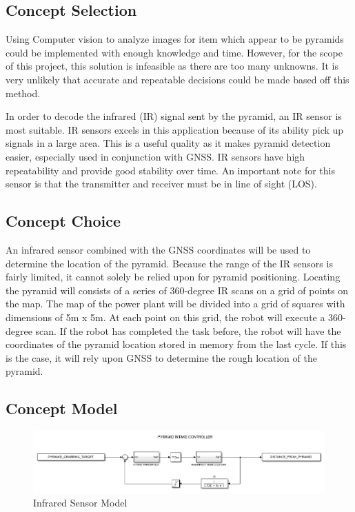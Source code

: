 \documentclass[12pt]{article}
\begin{document}
\subsection{Concept Selection}
Using Computer vision to analyze images for item which appear to be pyramids could be implemented with enough knowledge and time. However, for the scope of this project, this solution is infeasible as there are too many unknowns. It is very unlikely that accurate and repeatable decisions could be made based off this method.

In order to decode the infrared (IR) signal sent by the pyramid, an IR sensor is most suitable.  IR sensors excels in this application because of its ability pick up signals in a large area. This is a useful quality as it makes pyramid detection easier, especially used in conjunction with GNSS. IR sensors have high repeatability and provide good stability over time. An important note for this sensor is that the transmitter and receiver must be in line of sight (LOS). 


\subsection{Concept Choice}
An infrared sensor combined with the GNSS coordinates will be used to determine the location of the pyramid. Because the range of the IR sensors is fairly limited, it cannot solely be relied upon for pyramid positioning. Locating the pyramid will consists of a series of 360-degree IR scans on a grid of points on the map. The map of the power plant will be divided into a grid of squares with dimensions of 5m x 5m. At each point on this grid, the robot will execute a 360-degree scan. If the robot has completed the task before, the robot will have the coordinates of the pyramid location stored in memory from the last cycle. If this is the case, it will rely upon GNSS to determine the rough location of the pyramid. 


\subsection{Concept Model}
\begin{figure}[htb!]
\begin{center}
\caption{Infrared Sensor Model}
\includegraphics[scale=0.6]{Figures/simulink_pyramid}
\end{center}
\end{figure}
\FloatBarrier
\end{document}
